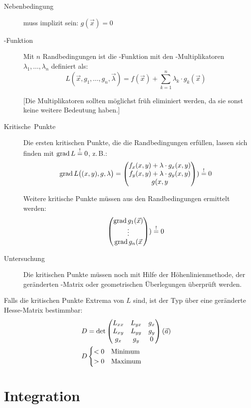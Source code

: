 \begin{description}
  \item [{Nebenbedingung}]
	muss implizit sein: $g(\vec x) = 0$
  \item [{-Funktion}] 
	Mit $n$ Randbedingungen ist die -Funktion mit den -Multiplikatoren $\lambda_1,\ldots,\lambda_n$ definiert als:
	\[ L(\vec x, g_1, \ldots, g_n, \vec\lambda) = f(\vec x) + \sum_{k=1}^n \lambda_k \cdot g_k(\vec x) \]
	
    [Die Multiplikatoren sollten möglichst früh eliminiert werden, da sie sonst keine weitere Bedeutung haben.]
  \item [{Kritische~Punkte}]
	Die ersten kritischen Punkte, die die Randbedingungen erfüllen, lassen sich finden mit
	$ \operatorname{grad} L \stackrel{!}{=} 0 $, z.\,B.:
	\[
	  \grad L\bigl( (x,y),g,\lambda \bigr) =
	  \veccc(
	    f_x(x,y) + \lambda \cdot g_x(x,y);
	    f_y(x,y) + \lambda \cdot g_y(x,y);
	    g(x,y)                           )
	  \stackrel{!}{=} 0
	\]
	
	Weitere kritische Punkte müssen aus den Randbedingungen ermittelt werden:
	\[
	  \veccc(
	    \grad g_1(\vec x);
	    \vdots           ;
	    \grad g_n(\vec x))
	  \stackrel{!}{=} 0
	\]

  \item [{Untersuchung}]
	Die kritischen Punkte müssen noch mit Hilfe der Höhenlinienmethode, der geränderten -Matrix oder geometrischen Überlegungen überprüft werden.
\end{description}

Falls die kritischen Punkte Extrema von $L$ sind, ist der Typ über eine geränderte Hesse-Matrix bestimmbar:
\begin{align*}
  D & = \det\begin{pmatrix}
  	L_{xx} & L_{yx} & g_{x} \\
  	L_{xy} & L_{yy} & g_{y} \\
  	g_{x}  & g_{y}  & 0
  \end{pmatrix}
  (\vec{a}) \\
  D & \begin{cases}
  	<0 & \hbox{Minimum} \\
  	>0 & \hbox{Maximum}
  \end{cases}
\end{align*}


\section{Integration}


